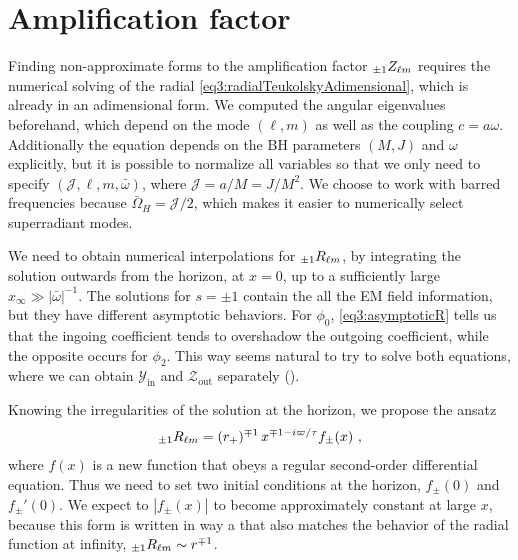 
\section{Amplification factor}

Finding non-approximate forms to the amplification factor $\uu[\pm 1]{Z}{\ell m}$ requires the numerical solving of the radial \eqref{eq3:radialTeukolskyAdimensional}, which is already in an adimensional form.
We computed the angular eigenvalues beforehand, which depend on the mode $(\ell,m)$ as well as the coupling $c=a\omega$.
Additionally the equation depends on the BH parameters $(M,J)$ and $\omega$ explicitly, but it is possible to normalize all variables so that we only need to specify $(\mathscr{J}, \ell, m, \bar{\omega})$, where $\mathscr{J}=a/M=J/M^2$.
We choose to work with barred frequencies because $\bar{\Omega}_H = \mathscr{J}/2$, which makes it easier to numerically select superradiant modes.

We need to obtain numerical interpolations for $\uu[\pm 1]{R}{\ell m}$, by integrating the solution outwards from the horizon, at $x=0$, up to a sufficiently large $x_\infty \gg |\bar{\omega}|^{-1}$. 
The solutions for $s=\pm 1$ contain the all the EM field information, but they have different asymptotic behaviors.
For $\phi_0$, \eqref{eq3:asymptoticR} tells us that the ingoing coefficient tends to overshadow the outgoing coefficient, while the opposite occurs for $\phi_2$.
This way seems natural to try to solve both equations, where we can obtain $\mathscr{Y}_\mathrm{in}$ and $\mathscr{Z}_\mathrm{out}$ separately ().

Knowing the irregularities of the solution at the horizon, we propose the ansatz
\begin{align}
	\label{eq4:numericalRansatz}
	\uu[\pm 1]{R}{\ell m} = (r_+)^{\mp 1} \, x^{ \mp 1 - i \varpi / \tau} f_{\pm}(x) ~,
\end{align}
where $f(x)$ is a new function that obeys a regular second-order differential equation.
Thus we need to set two initial conditions at the horizon, $f_{\pm}(0)$ and $f_{\pm}{\!}'(0)$.
We expect to $|f_\pm(x)|$ to become approximately constant at large $x$, because this
form is written in way a that also matches the behavior of the radial function at infinity, $\uu[\pm 1]{R}{\ell m}\sim r^{\mp 1}$.

